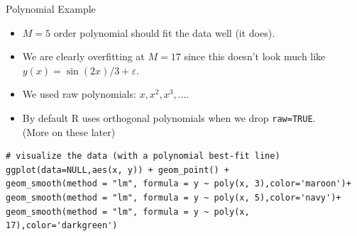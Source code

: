 \documentclass[11pt,handout,xcolor=pdftex,dvipsnames,table,mathserif,aspectratio=169]{beamer}
\begin{document}
\begin{frame}[fragile]{Polynomial Example}
\begin{itemize}
\item $M=5$ order polynomial should fit the data well (it does).
\item We are clearly \alert{overfitting} at $M=17$ since this doesn't look much like $y(x) = \sin(2x)/3 + \varepsilon$.
\item We used \alert{raw polynomials}: $x,x^2,x^3,\ldots$.
\item By default R uses \alert{orthogonal polynomials} when we drop \texttt{raw=TRUE}.\\
(More on these later)
\end{itemize}
\tiny 
\begin{verbatim}
# visualize the data (with a polynomial best-fit line)
ggplot(data=NULL,aes(x, y)) + geom_point() + 
geom_smooth(method = "lm", formula = y ~ poly(x, 3),color='maroon')+
geom_smooth(method = "lm", formula = y ~ poly(x, 5),color='navy')+
geom_smooth(method = "lm", formula = y ~ poly(x, 17),color='darkgreen')
\end{verbatim}
\end{frame}
\end{document}
